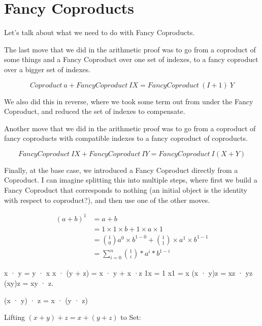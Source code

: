 \documentclass{proc-l}
\theoremstyle{definition}
\theoremstyle{remark}
\numberwithin{equation}{section}
\begin{document}
\section{Fancy Coproducts}

Let's talk about what we need to do with Fancy Coproducts.

The last move that we did in the arithmetic proof was
to go from a coproduct of some things and a Fancy Coproduct over one set of indexes, to a fancy coproduct over a bigger set of indexes.

\[
Coproduct~a + FancyCoproduct~I X = FancyCoproduct~(I+1)~Y
\]

We also did this in reverse, where we took some term out from under the Fancy Coproduct, and reduced the set of indexes to compensate.

Another move that we did in the arithmetic proof was
to go from a coproduct of fancy coproducts with compatible indexes to a fancy coproduct of coproducts.

\[
FancyCoproduct~I X + FancyCoproduct~I Y = FancyCoproduct~I (X + Y)
\]


Finally, at the base case, we introduced a Fancy Coproduct directly from a Coproduct. I can imagine splitting this into multiple steps,
where first we build a Fancy Coproduct that corresponds to nothing (an initial object is the identity with respect to coproduct?), and then use one of the other moves.





\begin{align*}
(a + b)^1 & = a + b \\ %
& = 1 \times 1 \times b + 1 \times a \times 1 \\ %
& = {1 \choose 0} a^0 \times b^{1-0} + {1 \choose 1} \times a^1 \times b^{1-1} \\ %
& = \sum_{i=0}^n {1 \choose i} * a^i * b^{1-i} %
\end{align*}


x · y = y · x
x · (y + z) = x · y + x ·z
1x = 1
x1 = x
(x · y)z = xz · yz
(xy)z = xy · z.


(x · y) · z = x · (y · z)

Lifting \((x + y) + z = x + (y + z)\) to Set:
\end{document}
